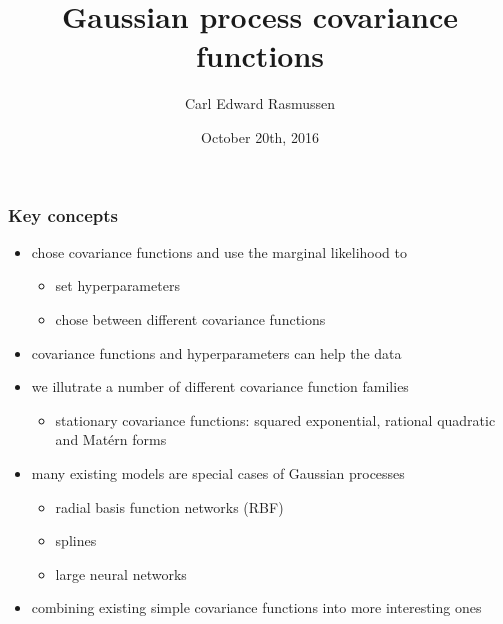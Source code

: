 

\title{Gaussian process covariance functions}
\author{Carl Edward Rasmussen}
\date{October 20th, 2016}



\begin{frame}
\titlepage
\end{frame}

\begin{frame}
\frametitle{Key concepts}

\begin{itemize}
\item chose covariance functions and use the marginal likelihood to
\begin{itemize}
\item set hyperparameters
\item chose between different covariance functions
\end{itemize}
\item covariance functions and hyperparameters can help
   the data
\item we illutrate a number of different covariance function families
\begin{itemize}
\item stationary covariance functions: squared exponential, rational
  quadratic and Mat\'ern forms
\end{itemize}
\item many existing models are special cases of Gaussian processes
\begin{itemize}
\item radial basis function networks (RBF)
\item splines
\item large neural networks
\end{itemize}
\item combining existing simple covariance functions into more
  interesting ones
\end{itemize}

\end{frame}

